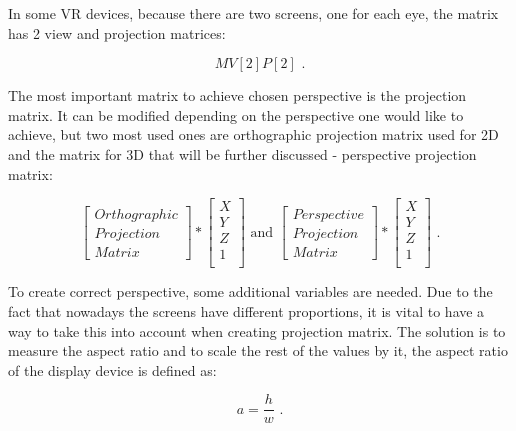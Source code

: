 In some VR devices, because there are two screens, one for each eye, the matrix has 2 view and projection matrices: 

\begin{equation}
MV[2]P[2]
\text{ .}
\label{mvp2equation}
\end{equation}

The most important matrix to achieve chosen perspective is the projection matrix. It can be modified depending on the perspective one would like to achieve, but two most used ones are orthographic projection matrix used for 2D and the matrix for 3D that will be further discussed - perspective projection matrix:

\begin{equation}
\begin{bmatrix}
Orthographic\\
Projection \\
Matrix
\end{bmatrix} 
*
\begin{bmatrix}
X\\
Y\\
Z\\
1\\
\end{bmatrix} 
\text{ and }
\begin{bmatrix}
Perspective\\
Projection \\
Matrix
\end{bmatrix} 
*
\begin{bmatrix}
X\\
Y\\
Z\\
1\\
\end{bmatrix}
\text{ .}
\label{projectionmatrices}
\end{equation}

To create correct perspective, some additional variables are needed. Due to the fact that nowadays the screens have different proportions, it is vital to have a way to take this into account when creating projection matrix. The solution is to measure the aspect ratio and to scale the rest of the values by it, the aspect ratio of the display device is defined as:

\begin{equation}
a=\frac{h}{w}
\text{ .}
\label{aequation}
\end{equation}

